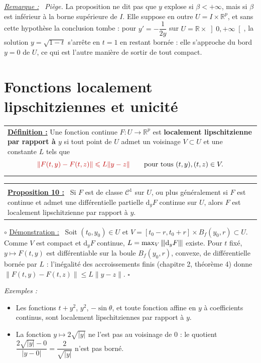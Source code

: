 \documentclass[a4paper,twoside]{report}
\makeatletter
\newcommand{\mot}[1]{\textcolor{rougecours}{\textbf{#1}}}
\newcommand{\rmath}[1]{\textcolor{rougecours}{#1}}
\newenvironment{cadre}%
 {\par\vspace{2mm}\noindent\begin{tabular}{|@{\hspace{4mm}}p{0.93\textwidth}@{\hspace{4mm}}|}
  \hline \\[-2mm]}%
 {\\[2mm] \hline \end{tabular}\par\vspace{3mm}}
\newcommand{\propo}[1]{\textbf{\underline{Proposition #1 :}}~}
\newenvironment{demo}%
 {\par\needspace{4\baselineskip}\vspace{1mm}\noindent$\circ$ \underline{Démonstration :}~\setlength{\parskip}{3pt plus 1pt}}%
 {\hfill$\square$\par\vspace{2mm}}
\newenvironment{remarque}%
 {\par\needspace{6\baselineskip}\vspace{1mm}\begin{list}{}{\leftmargin=1cm \rightmargin=0.5cm}\item[]%
  \textit{\underline{Remarque :}}~}%
 {\end{list}\vspace{1mm}}
\newenvironment{exemples}%
 {\par\needspace{6\baselineskip}\vspace{1mm}\begin{list}{}{\leftmargin=1cm \rightmargin=0.5cm}\item[]%
  \textit{Exemples :}%
  \begin{itemize}[label=$\bullet$,leftmargin=0.45cm,topsep=3pt,itemsep=4pt]}%
 {\end{itemize}\end{list}\vspace{1mm}}
\newcommand{\R}{\mathbb{R}}
\newcommand{\dd}{\mathrm{d}}                      %
\newcommand{\norme}[1]{\lVert #1 \rVert}         %
\newcommand{\nop}[1]{|\mkern-1.5mu|\mkern-1.5mu|#1|\mkern-1.5mu|\mkern-1.5mu|}   %
\newcommand{\Bf}{B_{f}}                           %
\newcommand{\Cc}{\mathcal{C}}                     %
\makeatother
\begin{document}
\begin{remarque}
\emph{Piège.} La proposition ne dit pas que $y$ explose si $\beta < +\infty$, mais si $\beta$ est inférieur à la borne supérieure de $I$. Elle suppose en outre $U = I \times \R^{p}$, et sans cette hypothèse la conclusion tombe : pour $y' = -\dfrac{1}{2y}$ sur $U = \R \times \left]0, +\infty\right[$, la solution $y = \sqrt{1 - t}$ s'arrête en $t = 1$ en restant bornée : elle s'approche du bord $y = 0$ de $U$, ce qui est l'autre manière de sortir de tout compact.
\end{remarque}
\section[Lipschitz locale et unicité]{Fonctions localement lipschitziennes et unicité}

\begin{center}
\begin{tabularx}{15cm}{||X}
\noindent \textbf{\underline{Définition :}} Une fonction continue $F : U \to \R^{p}$ est \mot{localement lipschitzienne par rapport à $y$} si tout point de $U$ admet un voisinage $V \subset U$ et une constante $L$ tels que
\[ \rmath{\norme{F(t, y) - F(t, z)} \leqslant L\norme{y - z}} \qquad \text{pour tous } (t, y), (t, z) \in V. \]
\end{tabularx}
\end{center}

\begin{cadre}
\propo{10} Si $F$ est de classe $\Cc^{1}$ sur $U$, ou plus généralement si $F$ est continue et admet une différentielle partielle $\dd_{y}F$ continue sur $U$, alors $F$ est localement lipschitzienne par rapport à $y$.
\end{cadre}

\begin{demo}
Soit $(t_{0}, y_{0}) \in U$ et $V = [t_{0} - r, t_{0} + r] \times \Bf(y_{0}, r) \subset U$. Comme $V$ est compact et $\dd_{y}F$ continue, $L = \max_{V}\nop{\dd_{y}F}$ existe. Pour $t$ fixé, $y \mapsto F(t, y)$ est différentiable sur la boule $\Bf(y_{0}, r)$, convexe, de différentielle bornée par $L$ : l'inégalité des accroissements finis (chapitre 2, théorème 4) donne $\norme{F(t, y) - F(t, z)} \leqslant L\norme{y - z}$.
\end{demo}

\begin{exemples}
  \item Les fonctions $t + y^{2}$, $y^{2}$, $-\sin\theta$, et toute fonction affine en $y$ à coefficients continus, sont localement lipschitziennes par rapport à $y$.
  \item La fonction $y \mapsto 2\sqrt{|y|}$ ne l'est pas au voisinage de $0$ : le quotient $\dfrac{2\sqrt{|y|} - 0}{|y - 0|} = \dfrac{2}{\sqrt{|y|}}$ n'est pas borné.
\end{exemples}
\end{document}
